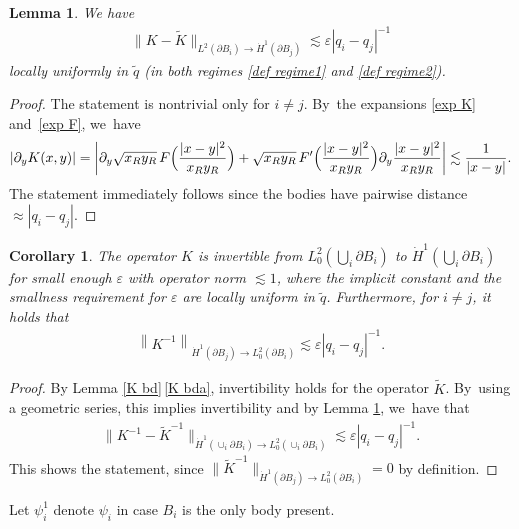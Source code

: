 \documentclass[JEP,XML,SOM,Unicode,published]{cedram}
\let\epsilon\varepsilon
\newtheorem{corollary}[theorem]{Corollary}
\newtheorem{lemma}[theorem]{Lemma}
\theoremstyle{definition}
\newcommand\norm[1]{\left\lVert #1\right\rVert}
\newcommand\anorm[1]{\lVert #1\rVert}
\newcommand\bnorm[1]{\bigl\lVert #1\bigr\rVert}
\newcommand\eq{=}
\let\de\partial
\let\eps\epsilon
\begin{document}
\begin{lemma}\label{comp tilde K}
We have
\begin{align*}
\anorm{K-\tilde{K}}_{L^2(\de B_i)\to \dot{H}^1(\de B_j)}\lesssim \eps|q_i-q_j|^{-1}
\end{align*}
locally uniformly in $\tilde{q}$ (in both regimes \eqref{def regime1} and \eqref{def regime2}).
\end{lemma}
\begin{proof}
The statement is nontrivial only for $i\neq j$. By~the expansions \eqref{exp K} and~\eqref{exp F}, we~have
\begin{align*}
|\de_yK(x,y)|\eq\left|\de_y\sqrt{x_Ry_R}\,F\Bigl(\frac{|x-y|^2}{x_Ry_R}\Bigr)+\sqrt{x_Ry_R}\,F'\Bigl(\frac{|x-y|^2}{x_Ry_R}\Bigr)\de_y\frac{|x-y|^2}{x_Ry_R}\right|\lesssim \frac{1}{|x-y|}.
\end{align*}
The statement immediately follows since the bodies have pairwise distance \hbox{$\approx |q_i-q_j|$}.
\end{proof}

\begin{corollary}\label{K inv mult}
The operator $K$ is invertible from $L_0^2(\bigcup_i \de B_i)$ to $\dot{H}^1(\bigcup_i \de B_i)$ for small enough $\eps$ with operator norm $\lesssim 1$, where the implicit constant and the smallness requirement for $\eps$ are locally uniform in $\tilde{q}$. Furthermore, for $i\neq j$, it holds that
\begin{align}
\norm{K^{-1}}_{\dot{H}^1(\de B_j)\to L_0^2(\de B_i)}\lesssim \eps|q_i-q_j|^{-1}.\label{double bd}
\end{align}
\end{corollary}
\begin{proof}
By Lemma \ref{K bd}\,\eqref{K bda}, invertibility holds for the operator $\tilde{K}$. By~using \eg a geometric series, this implies invertibility and by Lemma \ref{comp tilde K}, we~have that
\begin{align*}
\bnorm{K^{-1}-\tilde{K}^{-1}}_{\dot{H}^1(\cup_i\de B_i)\to L_0^2(\cup_i\de B_i)}\lesssim \eps|q_i-q_j|^{-1}.
\end{align*}
This shows the statement, since $\anorm{\tilde{K}^{-1}}_{\dot{H}^1(\de B_j)\to L_0^2(\de B_i)}=0$ by definition.
\end{proof}

Let $\psi_i^1$ denote $\psi_i$ in case $B_i$ is the only body present.
\end{document}
